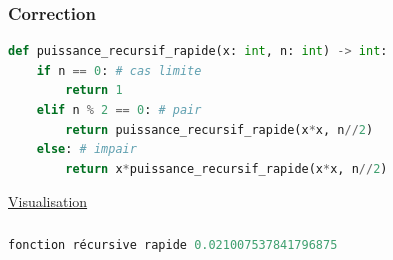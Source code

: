 \documentclass[svgnames,11pt]{beamer}
\begin{document}
\begin{frame}[fragile]
    \frametitle{Correction}

\begin{center}
\begin{lstlisting}[language=Python , basicstyle=\ttfamily\small, xleftmargin=0.5em, xrightmargin=-0.5em]
def puissance_recursif_rapide(x: int, n: int) -> int:
    if n == 0: # cas limite
        return 1
    elif n % 2 == 0: # pair
        return puissance_recursif_rapide(x*x, n//2)
    else: # impair
        return x*puissance_recursif_rapide(x*x, n//2)
\end{lstlisting}
\label{CODE}
\end{center}
\begin{center}
    \href{https://pythontutor.com/visualize.html#code=def%20puissance_recursif_rapide%28x,%20n%29%3A%0A%20%20%20%20if%20n%20%3D%3D%200%3A%0A%20%20%20%20%20%20%20%20return%201%0A%20%20%20%20elif%20n%20%25%202%20%3D%3D%200%3A%0A%20%20%20%20%20%20%20%20return%20puissance_recursif_rapide%28x*x,%20n//2%29%0A%20%20%20%20else%3A%0A%20%20%20%20%20%20%20%20return%20x*puissance_recursif_rapide%28x*x,%20n//2%29%0A%0Apuissance_recursif_rapide%283,%205%29&cumulative=false&curInstr=0&heapPrimitives=nevernest&mode=display&origin=opt-frontend.js&py=3&rawInputLstJSON=%5B%5D&textReferences=false}{Visualisation}
\end{center}
\end{frame}
\begin{frame}[fragile]
    \frametitle{}

    \begin{center}
        \begin{lstlisting}[language=Python , basicstyle=\ttfamily\small, xleftmargin=2em, xrightmargin=2em]
fonction récursive rapide 0.021007537841796875
\end{lstlisting}
        \label{CODE}
        \end{center}
\end{frame}
\end{document}
